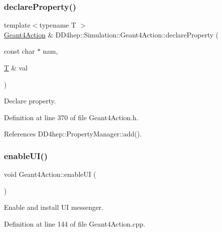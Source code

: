 \subsubsection{\texorpdfstring{declare\+Property()}{declareProperty()}\hspace{0.1cm}{\footnotesize\ttfamily [2/2]}}
{\footnotesize\ttfamily template$<$typename T $>$ \\
\hyperlink{class_d_d4hep_1_1_simulation_1_1_geant4_action}{Geant4\+Action} \& D\+D4hep\+::\+Simulation\+::\+Geant4\+Action\+::declare\+Property (\begin{DoxyParamCaption}\item[{const char $\ast$}]{nam,  }\item[{\hyperlink{class_t}{T} \&}]{val }\end{DoxyParamCaption})}



Declare property. 



Definition at line 370 of file Geant4\+Action.\+h.



References D\+D4hep\+::\+Property\+Manager\+::add().

\hypertarget{class_d_d4hep_1_1_simulation_1_1_geant4_action_a3cc9526eece0aaceec6b62fa74d8c055}{}\label{class_d_d4hep_1_1_simulation_1_1_geant4_action_a3cc9526eece0aaceec6b62fa74d8c055} 
\subsubsection{\texorpdfstring{enable\+U\+I()}{enableUI()}}
{\footnotesize\ttfamily void Geant4\+Action\+::enable\+UI (\begin{DoxyParamCaption}{ }\end{DoxyParamCaption})\hspace{0.3cm}{\ttfamily [virtual]}}



Enable and install UI messenger. 



Definition at line 144 of file Geant4\+Action.\+cpp.

\hypertarget{class_d_d4hep_1_1_simulation_1_1_geant4_action_a1abdae5d2d2af327f406697322b0d821}{}\label{class_d_d4hep_1_1_simulation_1_1_geant4_action_a1abdae5d2d2af327f406697322b0d821} 
